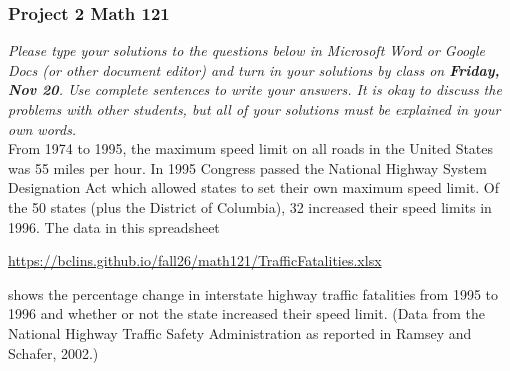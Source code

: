 \documentclass[12pt]{exam}
\begin{document}
\subsubsection*{Project 2 \hfill Math 121} 

\textit{Please type your solutions to the questions below in Microsoft Word or Google Docs (or other document editor) and turn in your solutions by class on \textbf{Friday, Nov 20}. Use complete sentences to write your answers.  It is okay to discuss the problems with other students, but all of your solutions must be explained in your own words. }  \\

\noindent
From 1974 to 1995, the maximum speed limit on all roads in the United States was 55 miles per hour.  In 1995 Congress passed the National Highway System Designation Act which allowed states to set their own maximum speed limit. Of the 50 states (plus the District of Columbia), 32 increased their speed limits in 1996. The data in this spreadsheet
\begin{center}
{\small
\url{https://bclins.github.io/fall26/math121/TrafficFatalities.xlsx}
}
\end{center}
shows the percentage change in interstate highway traffic fatalities from 1995 to 1996 and whether or not the state
increased their speed limit. (Data from the National Highway Traffic Safety Administration as reported
in Ramsey and Schafer, 2002.)
\end{document}
